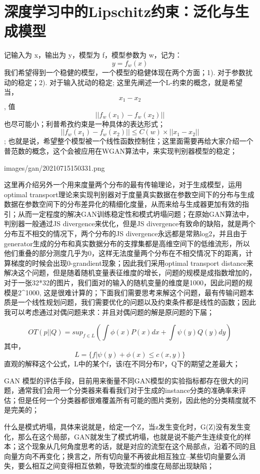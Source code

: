 \section{深度学习中的Lipschitz约束：泛化与生成模型} 
记输入为 x，输出为 y，模型为 f，模型参数为 w，记为：$$y=f_w(x)$$ 我们希望得到一个稳健的模型，一个模型的稳健体现在两个方面；1). 对于参数扰动的稳定；2). 对于输入扰动的稳定; 这里先阐述一个L-约束的概念，就是希望当，$$ x_1-x_2 $$, 值 $$||f_w(x_1)-f_w(x_2)||$$ 也尽可能小；利普希孜约束是一种具体的表达形式；$$ ||f_w(x_1)-f_w(x_2)|| \leq C(w) \times || x_1-x_2 || $$; 也就是说，希望整个模型被一个线性函数控制住；这里面需要再给大家介绍一个普范数的概念，这个会被应用在WGAN算法中，来实现判别器模型的稳定；

images/gan/20210715150331.png

这里再介绍另外一个用来度量两个分布的最有传输理论，对于生成模型，运用optimal transport理论来实现判别器对于度量真实数据在参数空间下的分布与生成数据在参数空间下的分布差异化的精细化度量，从而来给与生成器更加有效的指引；从而一定程度的解决GAN训练稳定性和模式坍塌问题；在原始GAN算法中，判别器一般通过JS divergence来优化，但是JS divergence有致命的缺陷，就是两个分布互不相交的情况下，两个分布的JS divergence永远都是常熟log2，并且由于generator生成的分布和真实数据分布的支撑集都是高维空间下的低维流形，所以他们重叠的部分测度几乎为0，这样无法度量两个分布在不相交情况下的距离，计算梯度的时候会出现0-grandient现象；因此我们采用optimal transport distance来解决这个问题，但是随着随机变量表征维度的增长，问题的规模是成指数增加的，对于一张32*32的图片，我们面对的输入的随机变量的维度是1000，因此问题的规模是2^1000, 这是很难计算的；下面我们需要思考来解这个问题，最有传输问题本质是一个线性规划问题，我们需要优化的问题以及约束条件都是线性的函数；因此我可以考虑通过对偶问题来求：并且对偶问题的解是原问题的下届；

$$
	OT(p||Q) = sup_{f\in L} ( \int \phi(x) P(x)dx + \int \psi(y)Q(y)dy ) 
$$
其中，$$L= \{ f | \psi(y)+\phi(x)\leq c(x,y) \}$$
直观的解释这个公式，L中的某个f，该f在不同分布P，Q下的期望之差最大；

GAN 模型的评估手段，目前用来衡量不同GAN模型的实验指标都存在很大的问题，通常我们会用一个分类器来看看我们对于生成的instance分类的准确率来评估；但是任何一个分类器都很难覆盖所有可能的图片类别，因此他的分类精度就不是完美的；

什么是模式坍塌，具体来说就是，给定一个Z，当z发生变化时，G(Z)没有发生变化，那么在这个局部，GAN就发生了模式坍塌，也就是说不能产生连续变化的样本；这个现象从几何角度思考的话，就是对应的流型在这个局部点，沿着不同的且向量方向不再变化；换言之，所有切向量不再彼此相互独立--某些切向量要么消失，要么相互之间变得相互依赖，导致流型的维度在局部出现缺陷；

